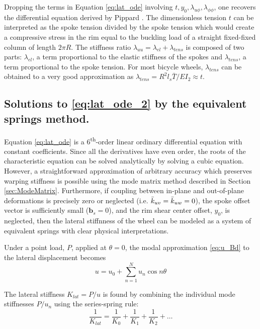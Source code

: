 \documentclass[\rootdir/thesis.tex]{subfiles}
\begin{document}
Dropping the terms in Equation \eqref{eq:lat_ode} involving $t, y_0, \lambda_{u\phi}, \lambda_{\phi\phi}$, one recovers the differential equation derived by Pippard \cite{Pippard1932a}. The dimensionless tension $t$ can be interpreted as the spoke tension divided by the spoke tension which would create a compressive stress in the rim equal to the buckling load of a straight fixed-fixed column of length $2\pi R$. The stiffness ratio $\lambda_{uu}=\lambda_{el}+\lambda_{tens}$ is composed of two parts: $\lambda_{el}$, a term proportional to the elastic stiffness of the spokes and $\lambda_{tens}$, a term proportional to the spoke tension. For most bicycle wheels, $\lambda_{tens}$ can be obtained to a very good approximation as $\lambda_{tens} = R^2l_s\bar{T}/EI_2 \approx t$.

\subsection{Solutions to \eqref{eq:lat_ode_2} by the equivalent springs method.}
\label{sec:equiv_springs}

Equation \eqref{eq:lat_ode} is a 6\textsuperscript{th}-order linear ordinary differential equation with constant coefficients. Since all the derivatives have even order, the roots of the characteristic equation can be solved analytically by solving a cubic equation. However, a straightforward approximation of arbitrary accuracy which preserves warping stiffness is possible using the mode matrix method described in Section \ref{sec:ModeMatrix}. Furthermore, if coupling between in-plane and out-of-plane deformations is precisely zero or neglected (i.e. $\bar{k}_{uv} = \bar{k}_{uw} = 0$), the spoke offset vector is sufficiently small ($\mathbf{b}_s=0$), and the rim shear center offset, $y_0$, is neglected, then the lateral stiffnness of the wheel can be modeled as a system of equivalent springs with clear physical interpretations.

Under a point load, $P$, applied at $\theta=0$, the modal approximation \eqref{eq:u_Bd} to the lateral displacement becomes
\begin{equation}
\label{eq:u_kequiv}
u = u_0 + \sum_{n=1}^N u_n \cos{n\theta}
\end{equation}

The lateral stiffness $K_{lat}=P/u$ is found by combining the individual mode stiffnesses $P/u_n$ using the series-spring rule:
\begin{equation}
\label{eq:Klat_series}
\frac{1}{K_{lat}} = \frac{1}{K_0} + \frac{1}{K_1} + \frac{1}{K_2} + \dots
\end{equation}
\end{document}
